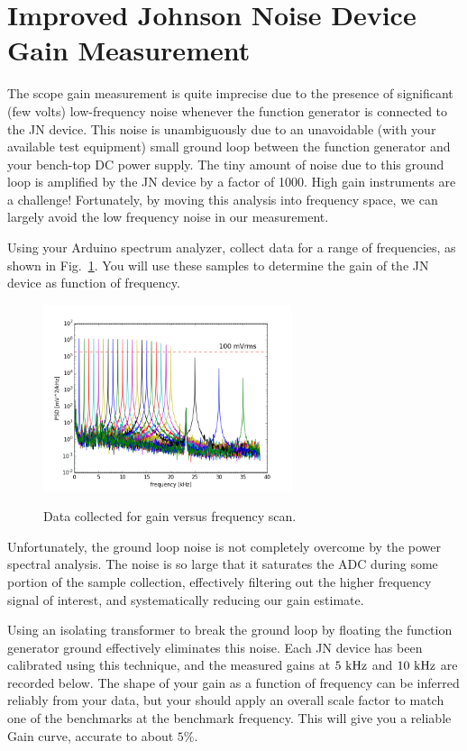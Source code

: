 \documentclass[12pt]{article}
\begin{document}
\newpage

\section{Improved Johnson Noise Device Gain Measurement}

The scope gain measurement is quite imprecise due to the presence of significant (few volts) low-frequency noise whenever the function generator is connected to the JN device.  This noise is unambiguously due to an unavoidable (with your available test equipment) small ground loop between the function generator and your bench-top DC power supply.  The tiny amount of noise due to this ground loop is amplified by the JN device by a factor of 1000.  High gain instruments are a challenge!  Fortunately, by moving this analysis into frequency space, we can largely avoid the low frequency noise in our measurement.

Using your Arduino spectrum analyzer, collect data for a range of frequencies, as shown in Fig.~\ref{fig:gain_raw}.  You will use these samples to determine the gain of the JN device as function of frequency.

\begin{figure}[htbp]
\begin{center}
{\includegraphics[width=0.65\textwidth]{figs/gain_raw.png}}
\end{center}
\caption{\label{fig:gain_raw}  Data collected for gain versus frequency scan.}\end{figure}

Unfortunately, the ground loop noise is not completely overcome by the power spectral analysis.   The noise is so large that it saturates the ADC during some portion of the sample collection, effectively filtering out the higher frequency signal of interest, and systematically reducing our gain estimate.

Using an isolating transformer to break the ground loop by floating the function generator ground effectively eliminates this noise.  Each JN device  has been calibrated using this technique, and the measured gains at $5~\rm kHz$ and $10~\rm kHz$ are recorded below.  The shape of your gain as a function of frequency can be inferred reliably from your data, but your should apply an overall scale factor to match one of the benchmarks at the benchmark frequency.  This will give you a reliable Gain curve, accurate to about $5\%$.
\end{document}
